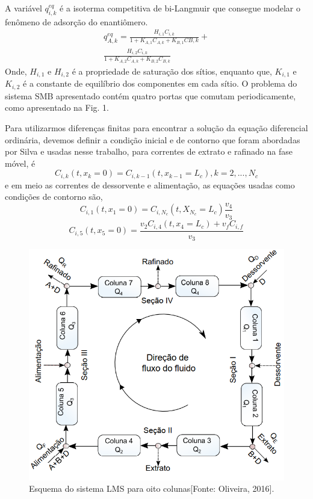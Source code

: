 \documentclass[por]{Template_SBEF}
\begin{document}
A variável  $q_{i,k}^{eq}$  é a isoterma competitiva de bi-Langmuir que consegue modelar o fenômeno de adsorção do enantiômero.
\begin{equation}
\begin{split}
q_{A,k}^{eq} = \frac{H_{i,1} C_{i,k}}{1+K_{A,1} C_{A,k} + K_{B,1} C{B,k}}+\\
\frac{H_{i,2} C_{i,k}}{1+K_{A,2} C_{A,k} + K_{B,2} C_{B,k}}
\end{split}
\end{equation}
Onde, $H_{i,1}$ e $H_{i,2}$ é a propriedade de saturação dos sítios, enquanto que, $K_{i,1}$ e $K_{i,2}$ é a constante de equilíbrio dos componentes em cada sítio.
O problema do sistema SMB apresentado contém quatro portas que comutam periodicamente, como apresentado na Fig. 1.

Para utilizarmos diferenças finitas para encontrar a solução da equação diferencial ordinária, devemos definir a condição inicial e de contorno que foram abordadas por Silva \cite{silva_mest} e usadas nesse trabalho, para correntes de extrato e rafinado na fase móvel, é
\begin{equation}
C_{i,k}(t,x_k = 0) = C_{i,k-1}(t, x_{k-1} = L_c), k = 2, ... , N_c
\end{equation}
e em meio as correntes de dessorvente e alimentação, as equações usadas como condições de contorno são,
\begin{equation}
C_{i,1}(t,x_1 = 0) = C_{i,N_c}(t,X_{N_c} = L_c) \frac{v_4}{v_3}
\end{equation}
\begin{equation}
C_{i,5}(t,x_5 = 0) = \frac{v_2 C_{i,4}(t,x_4 = L_c) + v_fC_{i,f}}{v_3} 
\end{equation}

\begin{figure}[H] 
 \centering
  \includegraphics[width=.8\columnwidth]{Arquivos/figura1.png} 
 \caption{Esquema do sistema LMS para oito colunas[Fonte: Oliveira, 2016].} \label{fig-1}
\end{figure}
\end{document}
